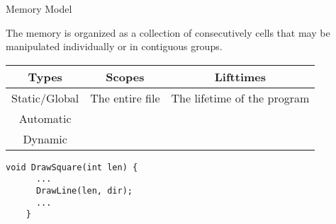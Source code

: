 \begin{frame}{}
  \centerline{\LARGE Memory Model}
\end{frame}

\begin{frame}{}
  \begin{definition}[Memory (K\&R)]
    The memory is organized as a collection of consecutively  cells
    that may be manipulated individually or in contiguous groups.
  \end{definition}

\end{frame}

\begin{frame}{}
\end{frame}

\begin{frame}{}
  \begin{table}
    \begin{tabular}{c|c|c}
      \hline
      Types & Scopes &Lifttimes \\ \hline
      Static/Global & The entire file & The lifetime of the program \\ \hline
      Automatic & & \\ \hline
      Dynamic & & \\ \hline
    \end{tabular}
  \end{table}
\end{frame}

\begin{frame}[fragile]{}

  \vspace{-0.30cm}
  \begin{lstlisting}[style = Cstyle]
    void DrawSquare(int len) {
      ...
      DrawLine(len, dir);
      ...
    }
  \end{lstlisting}
\end{frame}

